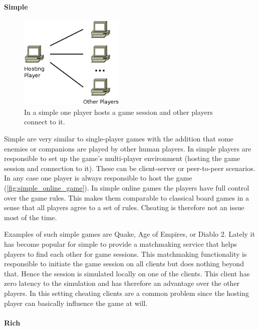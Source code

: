 \paragraph{Simple \ogs{}}

\begin{figure}
	\centering
	\includegraphics[width=5cm]{images/SimpleOnlineGame}
	\caption{In a simple \og{} one player hosts a game session and other players
	connect to it.}
	\label{fig:simple_online_game}
\end{figure}

Simple \ogs{} are very similar to single-player games with the addition that
some enemies or companions are played by other human players. In simple \ogs{}
players are responsible to set up the game's multi-player environment (hosting
the game session and connection to it). These can be client-server or
peer-to-peer scenarios. In any case one player is always responsible to host the
game (\autoref{fig:simple_online_game}). In simple online games the players have
full control over the game rules. This makes them comparable to classical board
games in a sense that all players agree to a set of rules. Cheating is therefore
not an issue most of the time.

Examples of such simple games are Quake, Age of Empires, or Diablo 2. Lately it
has become popular for simple \ogs{} to provide a matchmaking service that helps
players to find each other for game sessions. This matchmaking functionality is
responsible to initiate the game session on all clients but does nothing beyond
that. Hence the session is simulated locally on one of the clients. This client
has zero latency to the simulation and has therefore an advantage over the other
players. In this setting cheating clients are a common problem since the hosting
player can basically influence the game at will.

\newpage
\paragraph{Rich \ogs{}}

